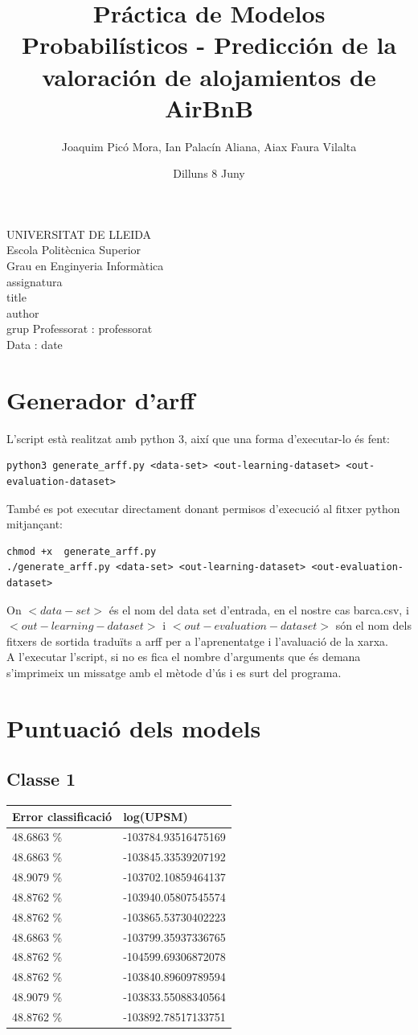 \documentclass{article}
\title{Práctica de Modelos Probabilísticos - Predicción de la valoración de alojamientos de AirBnB}
\author{Joaquim Picó Mora, Ian Palacín Aliana, Aiax Faura Vilalta}
\date{Dilluns 8 Juny}
\renewcommand{\maketitle}{ %
	\begin{titlepage}
		\raggedright{UNIVERSITAT DE LLEIDA \\
			Escola Politècnica Superior \\
			Grau en Enginyeria Informàtica\\
			\1assignatura\\}
		\vspace{5cm}
		\centering\huge{\5title \\}
		\vspace{3cm}
		\large{\6author} \\
		\normalsize{\3grup}
		\vfill
		Professorat : \4professorat \\
		Data : \7date
\end{titlepage}}
\begin{document}
	\maketitle
	\thispagestyle{empty}


\section{Generador d'arff}	
L'script està realitzat amb python 3, així que una forma d'executar-lo és fent:
\begin{verbatim}
python3 generate_arff.py <data-set> <out-learning-dataset> <out-evaluation-dataset>
\end{verbatim}
També es pot executar directament donant permisos d'execució al fitxer python mitjançant:
\begin{verbatim}
chmod +x  generate_arff.py
./generate_arff.py <data-set> <out-learning-dataset> <out-evaluation-dataset>
\end{verbatim}
On $<data-set>$ és el nom del data set d'entrada, en el nostre cas barca.csv, i $<out-learning-dataset>$ i $<out-evaluation-dataset>$ són el nom dels fitxers de sortida traduïts a arff per a l'aprenentatge i l'avaluació de la xarxa.\\
A l'executar l'script, si no es fica el nombre d'arguments que és demana s'imprimeix un missatge amb el mètode d'ús i es surt del programa. 
\section{Puntuació dels models}
\subsection{Classe 1}
\begin{table}[H]
\begin{tabular}{ll}
\hline
Error classificació & log(UPSM)           \\
\hline
48.6863 \%          & -103784.93516475169 \\
48.6863 \%          & -103845.33539207192 \\
48.9079 \%          & -103702.10859464137 \\
48.8762 \%          & -103940.05807545574 \\
48.8762 \%          & -103865.53730402223 \\
48.6863 \%          & -103799.35937336765 \\
48.8762 \%          & -104599.69306872078 \\
48.8762 \%          & -103840.89609789594 \\
48.9079 \%          & -103833.55088340564 \\
48.8762 \%          & -103892.78517133751
\end{tabular}
\end{table}
\end{document}

